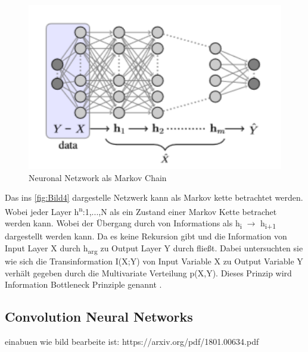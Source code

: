 \documentclass{llncs}
\begin{document}
\begin{figure}[htbp] 
	\centering
	\includegraphics[width=1.0\textwidth]{markovdeep.png}
	\caption{Neuronal Netzwork als Markov Chain}
	\label{fig:Bild1}
\end{figure}

Das ins \ref{fig:Bild4} dargestelle Netzwerk kann als Markov kette betrachtet werden. Wobei jeder Layer h\textsuperscript{n}:1,...,N als ein Zustand einer Markov Kette betrachet werden kann. Wobei der Übergang durch von Informations als h\textsubscript{i} $\rightarrow$ h\textsubscript{i+1} dargestellt werden kann. Da es keine Rekursion gibt und die Information von Input Layer X durch h\textsubscript{arg} zu Output Layer Y durch fließt. Dabei untersuchten sie wie sich die Transinformation I(X;Y) von Input Variable X zu Output Variable Y verhält gegeben durch die Multivariate Verteilung p(X,Y). Dieses Prinzip wird Information Bottleneck Prinziple genannt \cite{bottleneck}. 

\subsection{Convolution Neural Networks}

einabuen wie bild bearbeite ist:
https://arxiv.org/pdf/1801.00634.pdf
\end{document}
